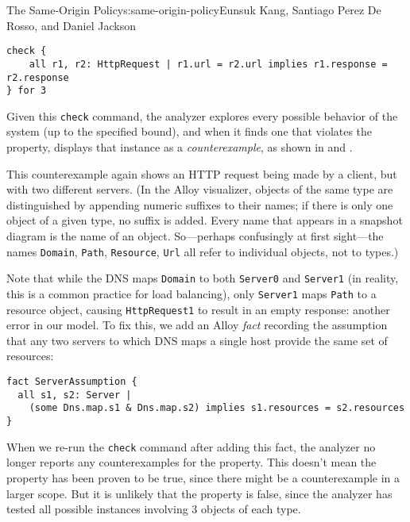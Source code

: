 \begin{aosachapter}{The Same-Origin Policy}{s:same-origin-policy}{Eunsuk Kang, Santiago Perez De Rosso, and Daniel Jackson}
\begin{verbatim}
check { 
    all r1, r2: HttpRequest | r1.url = r2.url implies r1.response = r2.response 
} for 3 
\end{verbatim}

Given this \texttt{check} command, the analyzer explores every possible
behavior of the system (up to the specified bound), and when it finds
one that violates the property, displays that instance as a
\emph{counterexample}, as shown in
 and
.



This counterexample again shows an HTTP request being made by a client,
but with two different servers. (In the Alloy visualizer, objects of the
same type are distinguished by appending numeric suffixes to their
names; if there is only one object of a given type, no suffix is added.
Every name that appears in a snapshot diagram is the name of an object.
So---perhaps confusingly at first sight---the names \texttt{Domain},
\texttt{Path}, \texttt{Resource}, \texttt{Url} all refer to individual
objects, not to types.)

Note that while the DNS maps \texttt{Domain} to both \texttt{Server0}
and \texttt{Server1} (in reality, this is a common practice for load
balancing), only \texttt{Server1} maps \texttt{Path} to a resource
object, causing \texttt{HttpRequest1} to result in an empty response:
another error in our model. To fix this, we add an Alloy \emph{fact}
recording the assumption that any two servers to which DNS maps a single
host provide the same set of resources:

\begin{verbatim}
fact ServerAssumption {
  all s1, s2: Server | 
    (some Dns.map.s1 & Dns.map.s2) implies s1.resources = s2.resources
}
\end{verbatim}

When we re-run the \texttt{check} command after adding this fact, the
analyzer no longer reports any counterexamples for the property. This
doesn't mean the property has been proven to be true, since there might
be a counterexample in a larger scope. But it is unlikely that the
property is false, since the analyzer has tested all possible instances
involving 3 objects of each type.


\end{aosachapter}
